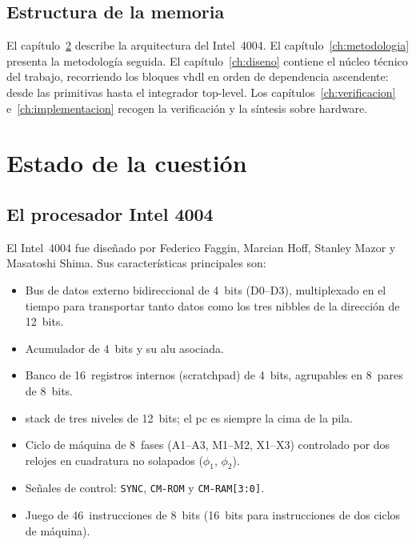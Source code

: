 \documentclass[%
    school=etsisi,%
    type=pfg,%
    degree=61CI,%
]{upm-report}
\begin{document}
\section{Estructura de la memoria}

El capítulo~\ref{ch:estado-cuestion} describe la arquitectura del Intel~4004.
El capítulo~\ref{ch:metodologia} presenta la metodología seguida.  El
capítulo~\ref{ch:diseno} contiene el núcleo técnico del trabajo, recorriendo
los bloques \acrshort{vhdl} en orden de dependencia ascendente: desde las
primitivas hasta el integrador top-level.  Los capítulos~\ref{ch:verificacion}
e~\ref{ch:implementacion} recogen la verificación y la síntesis sobre hardware.

\chapter{Estado de la cuestión}
\label{ch:estado-cuestion}

\section{El procesador Intel 4004}

El Intel~4004 fue diseñado por Federico Faggin, Marcian Hoff, Stanley Mazor
y Masatoshi Shima.  Sus características principales son:

\begin{itemize}
    \item Bus de datos externo bidireccional de 4~bits (D0--D3), multiplexado
        en el tiempo para transportar tanto datos como los tres \glspl{nibble}
        de la dirección de 12~bits.
    \item Acumulador de 4~bits y su \acrshort{alu} asociada.
    \item Banco de 16~registros internos (\gls{scratchpad}) de 4~bits,
        agrupables en 8~pares de 8~bits.
    \item \Gls{stack} de tres niveles de 12~bits; el \acrshort{pc} es siempre
        la cima de la pila.
    \item Ciclo de máquina de 8~fases (A1--A3, M1--M2, X1--X3) controlado
        por dos relojes en cuadratura no solapados ($\phi_1$, $\phi_2$).
    \item Señales de control: \texttt{SYNC}, \texttt{CM-ROM} y
        \texttt{CM-RAM[3:0]}.
    \item Juego de 46~instrucciones de 8~bits (16~bits para instrucciones de
        dos ciclos de máquina).
\end{itemize}
\end{document}

